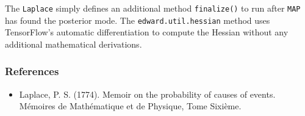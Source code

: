 The \texttt{Laplace} simply defines an additional method
\texttt{finalize()} to
run after \texttt{MAP} has found the posterior mode. The
\texttt{edward.util.hessian} method uses TensorFlow's automatic differentiation
to compute the Hessian without any additional mathematical derivations.

\subsubsection{References}\label{references}

\begin{itemize}
\item
  Laplace, P. S. (1774). Memoir on the probability of causes of
  events. Mémoires de Mathématique et de Physique, Tome Sixième.
\end{itemize}
